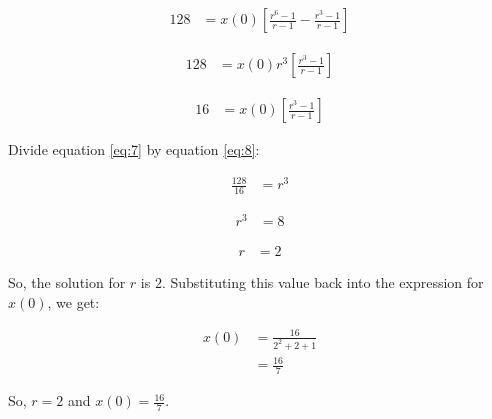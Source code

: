 \documentclass[journal,12pt,onecolumn]{IEEEtran}
\theoremstyle{remark}
\begin{document}
\begin{align}
128 &= x(0)\left[\frac{r^6 - 1}{r - 1} - \frac{r^3 - 1}{r - 1}\right] \label{eq:6}
\end{align}

\begin{align}
128 &= x(0)r^3\left[\frac{r^3 - 1}{r - 1}\right] \label{eq:7}
\end{align}

\begin{align}
16 &= x(0)\left[\frac{r^3 - 1}{r - 1}\right] \label{eq:8}
\end{align}

Divide equation \eqref{eq:7} by equation \eqref{eq:8}:

\begin{align}
\frac{128}{16} &= r^3 \label{eq:9}
\end{align}

\begin{align}
r^3 &= 8 \label{eq:10}
\end{align}

\begin{align}
r &= 2 \label{eq:11}
\end{align}

So, the solution for $r$ is $2$. Substituting this value back into the expression for $x(0)$, we get:

\begin{align}
x(0) &= \frac{16}{2^2 + 2 + 1} \label{eq:12} \\
&= \frac{16}{7} \label{eq:13}
\end{align}

So, $r = 2$ and $x(0) = \frac{16}{7}$.
\end{document}
